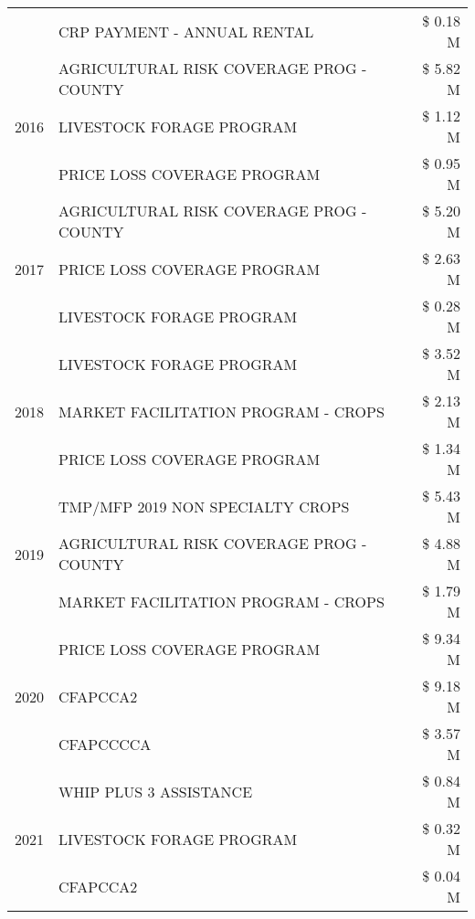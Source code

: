 \begin{tabular}{llr}
 & CRP PAYMENT - ANNUAL RENTAL & \$ 0.18 M \\
\cline{1-3}
\multirow[t]{3}{*}{2016} & AGRICULTURAL RISK COVERAGE PROG - COUNTY & \$ 5.82 M \\
 & LIVESTOCK FORAGE PROGRAM & \$ 1.12 M \\
 & PRICE LOSS COVERAGE PROGRAM & \$ 0.95 M \\
\cline{1-3}
\multirow[t]{3}{*}{2017} & AGRICULTURAL RISK COVERAGE PROG - COUNTY & \$ 5.20 M \\
 & PRICE LOSS COVERAGE PROGRAM & \$ 2.63 M \\
 & LIVESTOCK FORAGE PROGRAM & \$ 0.28 M \\
\cline{1-3}
\multirow[t]{3}{*}{2018} & LIVESTOCK FORAGE PROGRAM & \$ 3.52 M \\
 & MARKET FACILITATION PROGRAM - CROPS & \$ 2.13 M \\
 & PRICE LOSS COVERAGE PROGRAM & \$ 1.34 M \\
\cline{1-3}
\multirow[t]{3}{*}{2019} & TMP/MFP 2019 NON SPECIALTY CROPS & \$ 5.43 M \\
 & AGRICULTURAL RISK COVERAGE PROG - COUNTY & \$ 4.88 M \\
 & MARKET FACILITATION PROGRAM - CROPS & \$ 1.79 M \\
\cline{1-3}
\multirow[t]{3}{*}{2020} & PRICE LOSS COVERAGE PROGRAM & \$ 9.34 M \\
 & CFAPCCA2 & \$ 9.18 M \\
 & CFAPCCCCA & \$ 3.57 M \\
\cline{1-3}
\multirow[t]{3}{*}{2021} & WHIP PLUS 3 ASSISTANCE & \$ 0.84 M \\
 & LIVESTOCK FORAGE PROGRAM & \$ 0.32 M \\
 & CFAPCCA2 & \$ 0.04 M \\
\cline{1-3}
\bottomrule
\end{tabular}
